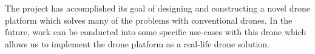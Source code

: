 \documentclass[12pt]{article}
\begin{document}
The project has accomplished its goal of designing and constructing a novel drone platform which solves many of the problems with conventional drones. In the future, work can be conducted into some specific use-cases with this drone which allows us to implement the drone platform as a real-life drone solution.



\end{document}
